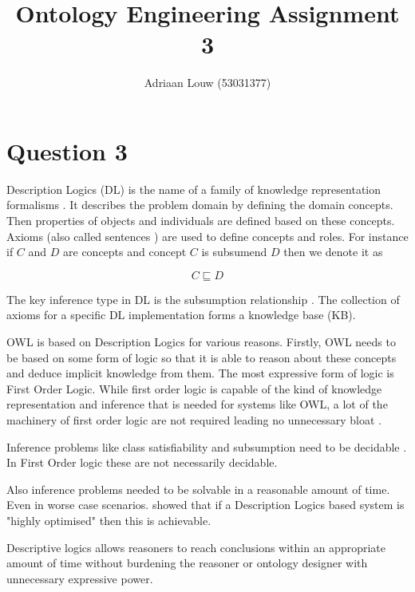 \documentclass[12pt,a4paper]{article}
\title{Ontology Engineering Assignment 3}
\author{Adriaan Louw (53031377)}
\begin{document}
\section{Question 3}

Description Logics (DL) is the name of a family of knowledge representation formalisms \citep{Baader}.
It describes the problem domain by defining the domain concepts. Then properties of objects and individuals are defined based on these concepts. Axioms (also called sentences ) are used to define concepts and roles. For instance if $C$ and $D$ are concepts and concept $C$ is subsumend $D$ then we denote it as

\begin{equation}
C \sqsubseteq D
\end{equation} 

The key inference type in DL is the subsumption relationship \citep{Baader}. The collection of axioms for a specific DL implementation forms a knowledge base (KB). 

OWL is based on Description Logics for various reasons. Firstly, OWL needs to be based on some form of logic so that it is able to reason about these concepts and deduce implicit knowledge from them. The most expressive form of logic is First Order Logic. While first order logic is capable of the kind of knowledge representation and inference that is needed for systems like OWL, a lot of the machinery of first order logic are not required leading no unnecessary bloat \citep{Baader}. 

Inference problems like class satisfiability and subsumption need to be decidable \citep{hor}. In First Order logic these are not necessarily decidable. 

Also inference problems needed to be solvable in a reasonable amount of time. Even in worse case scenarios. \cite{Baader} showed that if a Description Logics based system is "highly optimised" then this is achievable.

Descriptive logics allows reasoners to reach conclusions within an appropriate amount of time without burdening the reasoner or ontology designer with unnecessary expressive power. 


\end{document}

